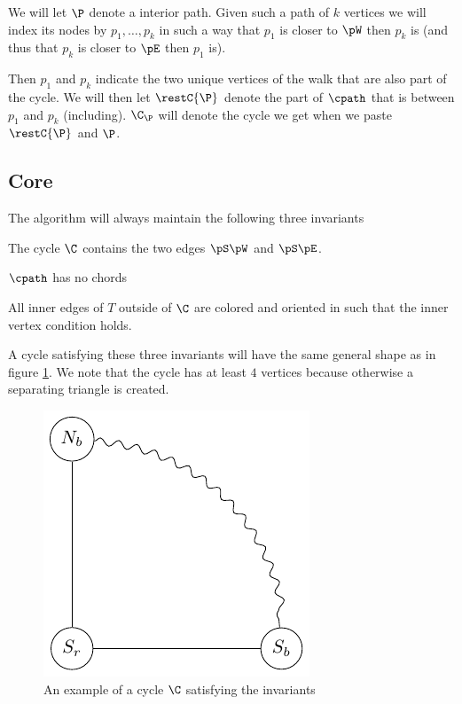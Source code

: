 We will let $\P$ denote a interior path. Given such a path of $k$ vertices we will index its nodes by $p_1, \ldots, p_k$ in such a way that $p_1$ is closer to $\pW$ then $p_k$ is (and thus that $p_k$ is closer to $\pE$ then $p_1$ is).

Then $p_1$ and $p_k$ indicate the two unique vertices of the walk that are also part of the cycle. We will then let $\restC{\P}$ denote the part of $\cpath$ that is between $p_1$ and $p_k$ (including). $\C_\P$ will denote the cycle we get when we paste $\restC{\P}$ and $\P$.



\subsection{Core}
\label{ss:core}

The algorithm will always maintain the following three invariants

\begin{invariants}
  \itemsep=-4pt

\item \label{i:SWandSE} The cycle $\C$ contains the two edges $\pS \pW$ and $\pS \pE$.
\item \label{i:noChords} $\cpath$ has no chords
\item \label{i:last} All inner edges of $T$ outside of $\C$ are colored and oriented in such that the inner vertex condition holds. %
\end{invariants}

A cycle satisfying these three invariants will have the same general shape as in figure \ref{fig:invCycle}. We note that the cycle has at least $4$ vertices because otherwise a separating triangle is created.

\begin{figure}[h!]
\centering
\includegraphics{algo/img/invCycle}

\caption{An example of a cycle $\C$ satisfying the invariants
    \label{fig:invCycle}}
\end{figure}

